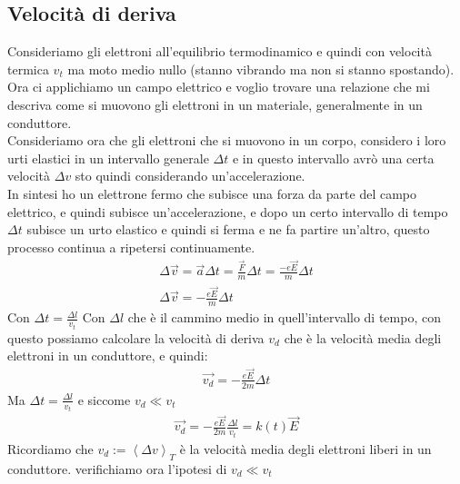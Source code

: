 \documentclass[a4paper, oneside]{article}
\begin{document}
\subsection{Velocità di deriva}
Consideriamo gli elettroni all'equilibrio termodinamico e quindi con velocità termica $v_t$ ma moto medio nullo (stanno vibrando ma non si stanno spostando).\\
Ora ci applichiamo un campo elettrico e voglio trovare una relazione che mi descriva come si muovono gli elettroni in un materiale, generalmente in un conduttore.\\
Consideriamo ora che gli elettroni che si muovono in un corpo, considero i loro urti elastici in un intervallo generale $\Delta t$ e in questo intervallo avrò una certa velocità $\Delta v$ sto quindi considerando un'accelerazione.\\
In sintesi ho un elettrone fermo che subisce una forza da parte del campo elettrico, e quindi subisce un'accelerazione, e dopo un certo intervallo di tempo $\Delta t$ subisce un urto elastico e quindi si ferma e ne fa partire un'altro, questo processo continua a ripetersi continuamente.\\
\begin{gather*}
    \Delta \vec{v} = \vec{a} \Delta t = \frac{\vec{F}}{m} \Delta t = \frac{-e \vec{E}}{m} \Delta t\\
    \Delta \vec{v} = -\frac{e \vec{E}}{m} \Delta t
\end{gather*}
Con $\Delta t = \frac{\Delta l}{v_t}$ Con $\Delta l$ che è il cammino medio in quell'intervallo di tempo, con questo possiamo calcolare la velocità di deriva $v_d$ che è la velocità media degli elettroni in un conduttore, e quindi:
\begin{gather*}
    \vec{v_d} =-\frac{e \vec{E}}{2m} \Delta t
\end{gather*}
Ma $\Delta t= \frac{\Delta l}{v_t}$ e siccome $v_d \ll v_t$
\begin{gather*}
    \vec{v_d} = - \frac{e \vec{E}}{2m} \frac{\Delta l}{v_t} = k(t) \vec{E}
\end{gather*}
Ricordiamo che $v_d := \left\langle \Delta v\right\rangle_T$ è la velocità media degli elettroni liberi in un conduttore.
verifichiamo ora l'ipotesi di $v_d \ll v_t$
\end{document}
